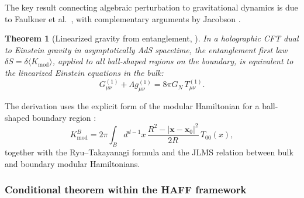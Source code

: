 \documentclass[12pt,a4paper,openany]{book}
\newtheorem{theorem}{Theorem}[chapter]
\begin{document}
The key result connecting algebraic perturbation to gravitational dynamics is due to Faulkner et al.\ \cite{Faulkner2014}, with complementary arguments by Jacobson \cite{Jacobson2016}.

\begin{theorem}[Linearized gravity from entanglement, {\cite{Faulkner2014}}]
\label{D-thm:linearized-Faulkner}
In a holographic CFT dual to Einstein gravity in asymptotically AdS spacetime, the entanglement first law $\delta S = \delta\langle K_{\mathrm{mod}}\rangle$, applied to all ball-shaped regions on the boundary, is equivalent to the linearized Einstein equations in the bulk:
\begin{equation}
G_{\mu\nu}^{(1)} + \Lambda g_{\mu\nu}^{(1)} = 8\pi G_N\, T_{\mu\nu}^{(1)}.
\end{equation}
\end{theorem}

The derivation uses the explicit form of the modular Hamiltonian for a ball-shaped boundary region \cite{CasiniHuertaMyers2011}:
\begin{equation}
K_{\mathrm{mod}}^B = 2\pi \int_B d^{d-1}x\, \frac{R^2 - |\mathbf{x} - \mathbf{x}_0|^2}{2R}\, T_{00}(x),
\end{equation}
together with the Ryu--Takayanagi formula and the JLMS relation \cite{JLMS2016} between bulk and boundary modular Hamiltonians.

\subsubsection{Conditional theorem within the HAFF framework}
\end{document}
